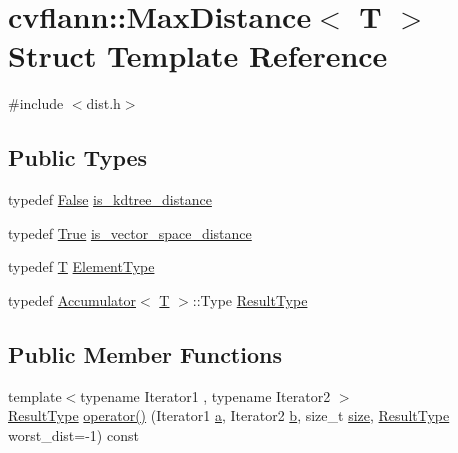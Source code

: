 \hypertarget{structcvflann_1_1MaxDistance}{\section{cvflann\-:\-:Max\-Distance$<$ T $>$ Struct Template Reference}
\label{structcvflann_1_1MaxDistance}
}


{\ttfamily \#include $<$dist.\-h$>$}

\subsection*{Public Types}
\begin{DoxyCompactItemize}
\item 
typedef \hyperlink{classcvflann_1_1False}{False} \hyperlink{structcvflann_1_1MaxDistance_a88f64a88adf9ee4b90f59c3156a172aa}{is\-\_\-kdtree\-\_\-distance}
\item 
typedef \hyperlink{classcvflann_1_1True}{True} \hyperlink{structcvflann_1_1MaxDistance_a176a0c9d37039a277617e8a8b53e05b4}{is\-\_\-vector\-\_\-space\-\_\-distance}
\item 
typedef \hyperlink{calib3d_8hpp_a3efb9551a871ddd0463079a808916717}{T} \hyperlink{structcvflann_1_1MaxDistance_a56df35de72712b6c97cf3ca7f299449f}{Element\-Type}
\item 
typedef \hyperlink{structcvflann_1_1Accumulator}{Accumulator}$<$ \hyperlink{calib3d_8hpp_a3efb9551a871ddd0463079a808916717}{T} $>$\-::Type \hyperlink{structcvflann_1_1MaxDistance_a180605be488b7132a31a86b93071e6a6}{Result\-Type}
\end{DoxyCompactItemize}
\subsection*{Public Member Functions}
\begin{DoxyCompactItemize}
\item 
{\footnotesize template$<$typename Iterator1 , typename Iterator2 $>$ }\\\hyperlink{structcvflann_1_1MaxDistance_a180605be488b7132a31a86b93071e6a6}{Result\-Type} \hyperlink{structcvflann_1_1MaxDistance_a92102e7ec3b5d3848e9577bdf6009f8a}{operator()} (Iterator1 \hyperlink{legacy_8hpp_a1031d0e0a97a340abfe0a6ab9e831045}{a}, Iterator2 \hyperlink{legacy_8hpp_ac04272e8ca865b8fba18d36edae9fd2a}{b}, size\-\_\-t \hyperlink{legacy_8hpp_ae97003f8d5c64cdfb99f6f2606d121b6}{size}, \hyperlink{structcvflann_1_1MaxDistance_a180605be488b7132a31a86b93071e6a6}{Result\-Type} worst\-\_\-dist=-\/1) const 
\end{DoxyCompactItemize}



